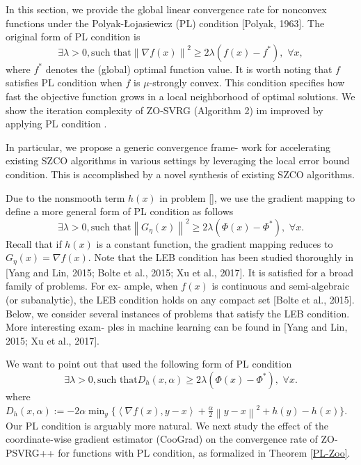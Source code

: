 \documentclass{article}
\newcommand{\norm}[1]{\left\lVert#1\right\rVert}
\newcommand{\Iprod}[2]{\left\langle #1,#2\right\rangle}
\theoremstyle{definition}
\theoremstyle{remark}
\begin{document}
In this section, we provide the global linear convergence rate for nonconvex functions under the Polyak-Łojasiewicz
(PL) condition [Polyak, 1963]. The original form of PL condition is
\begin{equation}
\exists \lambda >0, \text{such~that} \norm{\nabla f(x)}^2 \geq 2\lambda (f(x) - f^*),\,\, \forall x,
\end{equation}
where $f^*$ denotes the (global) optimal function value. It is worth noting that $f$ satisfies PL condition when $f$ is $\mu$-strongly convex.
{\color{RubineRed}
This condition specifies how fast the objective function grows in a local neighborhood of optimal solutions.
}
{\color{Brown} We show the iteration complexity of ZO-SVRG (Algorithm 2) im improved by applying PL condition .}

{\color{RubineRed}
In particular, we propose a generic convergence frame- work for accelerating existing SZCO algorithms in various settings by leveraging the local error bound condition. This
is accomplished by a novel synthesis of existing SZCO algorithms.
}

Due to the nonsmooth term $h(x)$ in problem \eqref{}, we use the gradient mapping to define a more general form of PL condition as follows
\begin{equation}
\exists \lambda >0, \text{such~that} \norm{G_{\eta}(x)}^2 \geq 2\lambda (\Phi(x) - \Phi^*),\,\, \forall x.
\end{equation}
Recall that if $h(x)$ is a constant function, the gradient mapping reduces to $G_{\eta}(x) = \nabla f(x)$.
{\color{RubineRed}
Note that the LEB condition has been studied thoroughly in [Yang and Lin, 2015; Bolte et al., 2015; Xu et al.,
2017]. It is satisfied for a broad family of problems. For ex-
ample, when $f(x)$ is continuous and semi-algebraic (or subanalytic), the LEB condition holds on any compact set [Bolte
et al., 2015]. Below, we consider several instances of problems that satisfy the LEB condition. More interesting exam-
ples in machine learning can be found in [Yang and Lin, 2015;
Xu et al., 2017].
}


We want to point out that \cite{} used the following form of PL condition
 \begin{equation}
\exists \lambda >0, \text{such~that} D_h(x,\alpha) \geq 2\lambda (\Phi(x) - \Phi^*),\,\, \forall x.
\end{equation} 
where $D_h(x,\alpha) := -2\alpha \min_y\{\Iprod{\nabla f(x)}{y-x} + \frac{\alpha}{2}\norm{y-x}^2+h(y)-h(x)\}$. Our PL condition is arguably more natural. We next study the effect of the coordinate-wise gradient estimator (CooGrad) on the convergence rate of ZO-PSVRG++ for functions with PL condition, as formalized in Theorem \ref{PL-Zoo}. 
\end{document}
